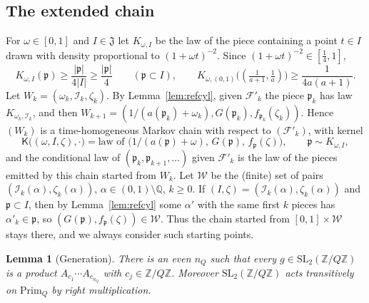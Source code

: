\documentclass[11pt]{amsart}
\newtheorem{lemma}[theorem]{Lemma}
\theoremstyle{definition}
\numberwithin{equation}{section}
\newcommand{\Z}{\mathbb{Z}}
\newcommand{\Q}{\mathbb{Q}}
\newcommand{\cF}{\mathcal{F}}
\newcommand{\cI}{\mathcal{I}}
\newcommand{\cW}{\mathcal{W}}
\newcommand{\fp}{\mathfrak{p}}
\newcommand{\Prim}{\mathrm{Prim}}
\begin{document}
\subsection{The extended chain}
For $\omega\in[0,1]$ and $I\in\mathfrak J$ let $K_{\omega,I}$ be the law of the piece containing a point $t\in I$ drawn with density proportional to
$(1+\omega t)^{-2}$. Since $(1+\omega t)^{-2}\in[\frac14,1]$,
\begin{equation}\label{eq:Klower}
K_{\omega,I}(\fp)\ge\frac{|\fp|}{4|I|}\ge\frac{|\fp|}4\qquad(\fp\subset I),\qquad K_{\omega,(0,1)}\big((\tfrac1{a+1},\tfrac1a)\big)\ge\frac1{4a(a+1)} .
\end{equation}
Let $W_k=(\omega_k,\cI_k,\zeta_k)$. By Lemma~\ref{lem:refcyl}, given $\cF'_k$ the piece $\fp_k$ has law $K_{\omega_k,\cI_k}$, and then
$W_{k+1}=(1/(a(\fp_k)+\omega_k),G(\fp_k),f_{\fp_k}(\zeta_k))$. Hence $(W_k)$ is a time-homogeneous Markov chain with respect to $(\cF'_k)$, with
kernel
\[
\mathsf K\big((\omega,I,\zeta),\cdot\big)=\text{law of }\big(1/(a(\fp)+\omega),\,G(\fp),\,f_\fp(\zeta)\big),\qquad \fp\sim K_{\omega,I},
\]
and the conditional law of $(\fp_k,\fp_{k+1},\dots)$ given $\cF'_k$ is the law of the pieces emitted by this chain started from $W_k$.
Let $\cW$ be the (finite) set of pairs $(\cI_k(\alpha),\zeta_k(\alpha))$, $\alpha\in(0,1)\setminus\Q$, $k\ge0$. If $(I,\zeta)=(\cI_k(\alpha),\zeta_k(\alpha))$ and
$\fp\subset I$, then by Lemma~\ref{lem:refcyl} some $\alpha'$ with the same first $k$ pieces has $\alpha'_k\in\fp$, so $(G(\fp),f_\fp(\zeta))\in\cW$.
Thus the chain started from $[0,1]\times\cW$ stays there, and we always consider such starting points.

\begin{lemma}[Generation]\label{lem:gen}
There is an even $n_Q$ such that every $g\in\mathrm{SL}_2(\Z/Q\Z)$ is a product $A_{c_1}\cdots A_{c_{n_Q}}$ with $c_j\in\Z/Q\Z$. Moreover
$\mathrm{SL}_2(\Z/Q\Z)$ acts transitively on $\Prim_Q$ by right multiplication.
\end{lemma}
\end{document}

